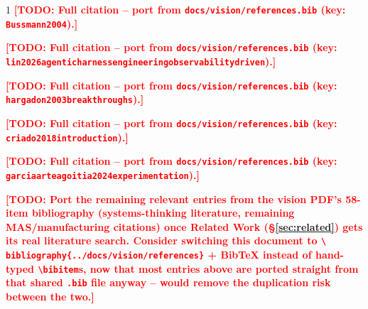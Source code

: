 \documentclass[10pt,conference]{IEEEtran}
\newcommand{\todo}[1]{\textcolor{red}{\textbf{[TODO: #1]}}}
\begin{document}
\begin{thebibliography}{1}
\todo{Full citation -- port from \texttt{docs/vision/references.bib}
(key: \texttt{Bussmann2004}).}

\todo{Full citation -- port from \texttt{docs/vision/references.bib}
(key: \texttt{lin2026agenticharnessengineeringobservabilitydriven}).}

\todo{Full citation -- port from \texttt{docs/vision/references.bib}
(key: \texttt{hargadon2003breakthroughs}).}

\todo{Full citation -- port from \texttt{docs/vision/references.bib}
(key: \texttt{criado2018introduction}).}

\todo{Full citation -- port from \texttt{docs/vision/references.bib}
(key: \texttt{garciaarteagoitia2024experimentation}).}

\todo{Port the remaining relevant entries from the vision PDF's 58-item
bibliography (systems-thinking literature, remaining MAS/manufacturing
citations) once Related Work (\S\ref{sec:related}) gets its real literature
search. Consider switching this document to \texttt{\textbackslash
bibliography\{../docs/vision/references\}} + BibTeX instead of hand-typed
\texttt{\textbackslash bibitem}s, now that most entries above are ported
straight from that shared \texttt{.bib} file anyway -- would remove the
duplication risk between the two.}

\end{thebibliography}
\end{document}

